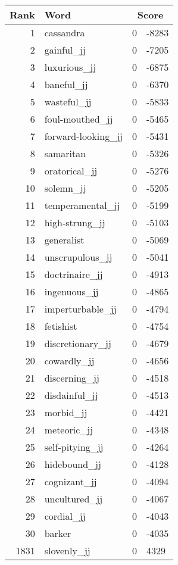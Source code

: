 \begin{longtable}[!htbp]{| rlr@{.}l |}
    \hline
    \textbf{Rank} & \textbf{Word} & \multicolumn{2}{c|}{\textbf{Score}} \\
    \hline
    \endhead
    1 & cassandra & 0 & -8283 \\
    2 & gainful\_jj & 0 & -7205 \\
    3 & luxurious\_jj & 0 & -6875 \\
    4 & baneful\_jj & 0 & -6370 \\
    5 & wasteful\_jj & 0 & -5833 \\
    6 & foul-mouthed\_jj & 0 & -5465 \\
    7 & forward-looking\_jj & 0 & -5431 \\
    8 & samaritan & 0 & -5326 \\
    9 & oratorical\_jj & 0 & -5276 \\
    10 & solemn\_jj & 0 & -5205 \\
    11 & temperamental\_jj & 0 & -5199 \\
    12 & high-strung\_jj & 0 & -5103 \\
    13 & generalist & 0 & -5069 \\
    14 & unscrupulous\_jj & 0 & -5041 \\
    15 & doctrinaire\_jj & 0 & -4913 \\
    16 & ingenuous\_jj & 0 & -4865 \\
    17 & imperturbable\_jj & 0 & -4794 \\
    18 & fetishist & 0 & -4754 \\
    19 & discretionary\_jj & 0 & -4679 \\
    20 & cowardly\_jj & 0 & -4656 \\
    21 & discerning\_jj & 0 & -4518 \\
    22 & disdainful\_jj & 0 & -4513 \\
    23 & morbid\_jj & 0 & -4421 \\
    24 & meteoric\_jj & 0 & -4348 \\
    25 & self-pitying\_jj & 0 & -4264 \\
    26 & hidebound\_jj & 0 & -4128 \\
    27 & cognizant\_jj & 0 & -4094 \\
    28 & uncultured\_jj & 0 & -4067 \\
    29 & cordial\_jj & 0 & -4043 \\
    30 & barker & 0 & -4035 \\
    1831 & slovenly\_jj & 0 & 4329 \\

\end{longtable}
